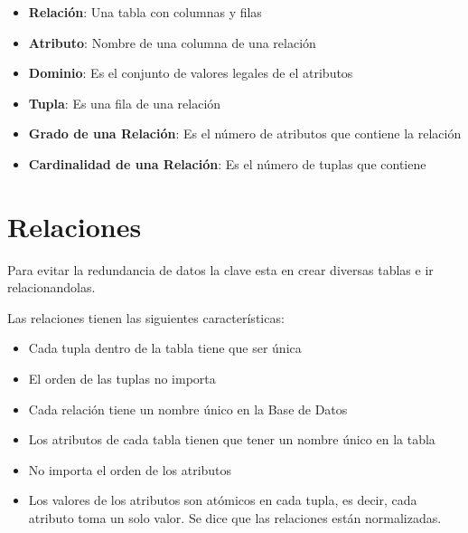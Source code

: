 \documentclass[12pt, fleqn]{report}                             %
\theoremstyle{break}                                            %
\begin{document}
            \begin{itemize}
                \item \textbf{Relación}: Una tabla con columnas y filas
                \item \textbf{Atributo}: Nombre de una columna de una relación
                \item \textbf{Dominio}: Es el conjunto de valores legales de el atributos
                \item \textbf{Tupla}: Es una fila de una relación
                \item \textbf{Grado de una Relación}: Es el número de atributos que contiene la relación
                \item \textbf{Cardinalidad de una Relación}: Es el número de tuplas que contiene
            \end{itemize}




        \clearpage
        \section{Relaciones}

            Para evitar la redundancia de datos la clave esta en crear diversas tablas
            e ir relacionandolas.

            Las relaciones tienen las siguientes características:

            \begin{itemize}
                \item Cada tupla dentro de la tabla tiene que ser única
                \item El orden de las tuplas no importa
                \item Cada relación tiene un nombre único en la Base de Datos
                \item Los atributos de cada tabla tienen que tener un nombre único en la tabla
                \item No importa el orden de los atributos
                \item Los valores de los atributos son atómicos en cada tupla, es decir,
                    cada atributo toma un solo valor. Se dice que las relaciones están normalizadas.
            \end{itemize}
\end{document}
